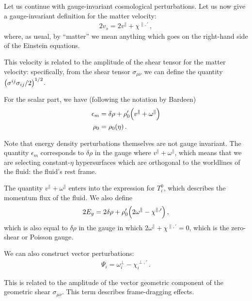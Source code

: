\documentclass[main.tex]{subfiles}
\begin{document}

Let us continue with gauge-invariant cosmological perturbations.
Let us now give a gauge-invariant definition for the matter velocity: 
%
\begin{align}
2 v_s = 2 v^{\parallel} + \chi^{\parallel, \prime}
\,,
\end{align}
%
where, as usual, by ``matter'' we mean anything which goes on the right-hand side of the Einstein equations. 

This velocity is related to the amplitude of the shear tensor for the matter velocity: specifically, from the shear tensor \(\sigma_{\mu \nu }\) we can define the quantity \(\qty(\sigma^{ij} \sigma_{ij} /2 )^{1/2}\). 

For the scalar part, we have (following the notation by Bardeen)
%
\begin{align}
\epsilon_m &= \delta \rho + \rho_0' \qty(v^{\parallel} + \omega^{\parallel} )  \\
\rho_0 &= \rho_0 (\eta )
\,.
\end{align}

Note that energy density perturbations themselves are not gauge invariant. 
The quantity \(\epsilon _m\) corresponds to \(\delta \rho \) in the gauge where \(v^{\parallel} + \omega^{\parallel}\), which means that we are selecting constant-\(\eta \) hypersurfaces which are orthogonal to the worldlines of the fluid: the fluid's rest frame. 

The quantity \(v^{\parallel} + \omega^{\parallel}\) enters into the expression for \(T^{0}_{i}\), which describes the momentum flux of the fluid. 
We also define 
%
\begin{align}
2 E_g = 2 \delta \rho + \rho_0' \qty(2 \omega^{\parallel} - \chi^{\parallel, \prime})
\,,
\end{align}
%
which is also equal to \(\delta \rho \) in the gauge in which \(2 \omega^{\parallel} + \chi^{\parallel, \prime} = 0\), which is the zero-shear or Poisson gauge. 

We can also construct vector perturbations: 
%
\begin{align}
\Psi_i = \omega^{\perp}_i - \chi_i^{\perp, \prime}
\,.
\end{align}

This is related to the amplitude of the vector geometric component of the geometric shear \(\sigma_{\mu \nu }\). 
This term describes frame-dragging effects. 
\end{document}
